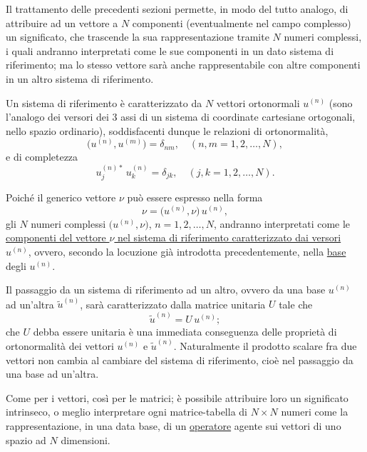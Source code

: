 \documentclass[11pt, a4paper]{book}
\numberwithin{equation}{section}
\begin{document}
Il trattamento delle precedenti sezioni permette, in modo del tutto
analogo, di attribuire ad un vettore a $N$ componenti (eventualmente nel
campo complesso) un significato, che trascende la sua rappresentazione
tramite $N$ numeri complessi, i quali andranno interpretati come le sue
componenti in un dato sistema di riferimento; ma lo stesso vettore sarà
anche rappresentabile con altre componenti in un altro sistema di
riferimento.

Un sistema di riferimento è caratterizzato da $N$ vettori ortonormali
$u^{(n)}$ (sono l'analogo dei versori dei 3 assi di un sistema di
coordinate cartesiane ortogonali, nello spazio ordinario), soddisfacenti
dunque le relazioni di ortonormalità,
\begin{equation}
\bigl(u^{(n)}, u^{(m)}\bigr) = \delta_{nm}, \quad (n,m = 1,2,\ldots,N),
\end{equation}
e di completezza
\begin{equation}
u_j^{(n)*}\,u_k^{(n)} = \delta_{jk}, \quad (j,k = 1,2,\ldots,N).
\end{equation}


Poiché il generico vettore $\nu$ può essere espresso nella forma
\begin{equation}
\nu = \bigl(u^{(n)}, \nu\bigr)\,u^{(n)},
\end{equation}
gli $N$ numeri complessi $\bigl(u^{(n)}, \nu\bigr)$, $n=1,2,\ldots,N$,
andranno interpretati come le \uline{componenti del vettore $\nu$ nel
sistema di riferimento caratterizzato dai versori $u^{(n)}$}, ovvero,
secondo la locuzione già introdotta precedentemente, nella \uline{base}
degli $u^{(n)}$.

Il passaggio da un sistema di riferimento ad un altro, ovvero da una base
$u^{(n)}$ ad un'altra $\widetilde{u}^{(n)}$, sarà caratterizzato dalla
matrice unitaria $U$ tale che
\begin{equation}
\widetilde{u}^{(n)} = U\,u^{(n)};
\end{equation}
che $U$ debba essere unitaria è una immediata conseguenza delle proprietà di
ortonormalità dei vettori $u^{(n)}$ e $\widetilde{u}^{(n)}$. Naturalmente
il prodotto scalare fra due vettori non cambia al cambiare del sistema di
riferimento, cioè nel passaggio da una base ad un'altra.

Come per i vettori, così per le matrici; è possibile attribuire loro un
significato intrinseco, o meglio interpretare ogni matrice-tabella di $N
\times N$ numeri come la rappresentazione, in una data base, di un
\uline{operatore} agente sui vettori di uno spazio ad $N$ dimensioni.
\end{document}
